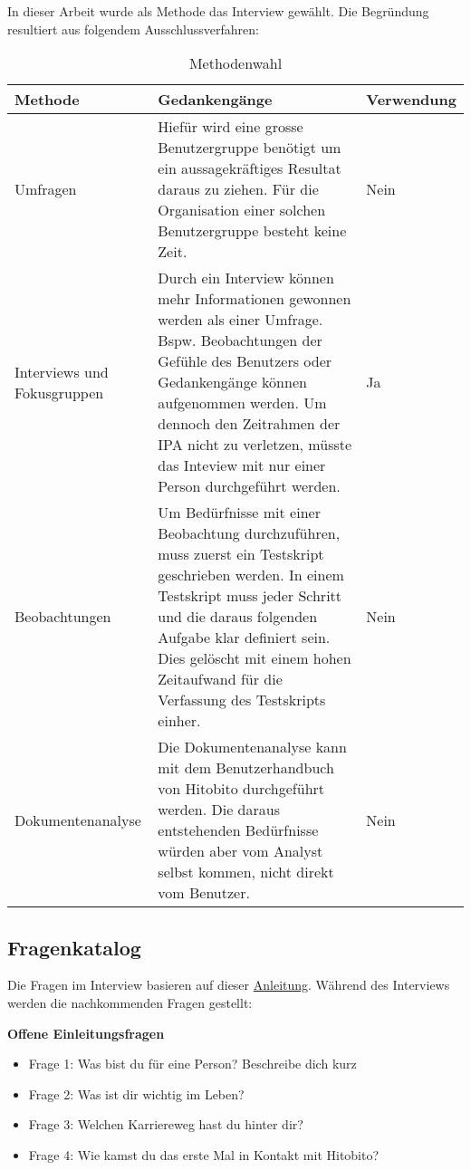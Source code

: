 \newpage

In dieser Arbeit wurde als Methode das Interview gewählt. Die Begründung resultiert aus folgendem Ausschlussverfahren:

\begin{table}[h!]
   \begin{tabular}{|L{0.2\textwidth}|L{0.5\textwidth}|L{0.2\textwidth}|}
       \hline
       \color{white}Methode & \color{white} Gedankengänge & \color{white} Verwendung \\
       \hline
       Umfragen & Hiefür wird eine grosse Benutzergruppe benötigt um ein aussagekräftiges Resultat daraus zu ziehen. 
       Für die Organisation einer solchen Benutzergruppe besteht keine Zeit. & Nein \\
       \hline
       Interviews und Fokusgruppen & Durch ein Interview können mehr Informationen gewonnen werden als einer Umfrage.
       Bspw. Beobachtungen der Gefühle des Benutzers oder Gedankengänge können aufgenommen werden. Um dennoch den Zeitrahmen der IPA
       nicht zu verletzen, müsste das Inteview mit nur einer Person durchgeführt werden. & Ja \\
       \hline
       Beobachtungen & Um Bedürfnisse mit einer Beobachtung durchzuführen, muss zuerst ein Testskript geschrieben werden.
       In einem Testskript muss jeder Schritt und die daraus folgenden Aufgabe klar definiert sein. Dies gelöscht
       mit einem hohen Zeitaufwand für die Verfassung des Testskripts einher. & Nein \\
       \hline
       Dokumentenanalyse & Die Dokumentenanalyse kann mit dem Benutzerhandbuch von Hitobito durchgeführt werden.
      Die daraus entstehenden Bedürfnisse würden aber vom Analyst selbst kommen, nicht direkt vom Benutzer. & Nein \\
     \hline
     \end{tabular}
     \caption{Methodenwahl}
\end{table}

\newpage

\subsection{Fragenkatalog}
Die Fragen im Interview basieren auf dieser \href{https://kreativ.mfg.de/digitale-kultur/kompass-digitale-kultur/prozess/nutzerinnen-gruppe/bedarfsanalyse-interviews/}{Anleitung}.
Während des Interviews werden die nachkommenden Fragen gestellt:

\textbf{Offene Einleitungsfragen}
\begin{itemize}
   \item Frage 1: Was bist du für eine Person? Beschreibe dich kurz
   \item Frage 2: Was ist dir wichtig im Leben?
   \item Frage 3: Welchen Karriereweg hast du hinter dir? 
   \item Frage 4: Wie kamst du das erste Mal in Kontakt mit Hitobito?
\end{itemize}

